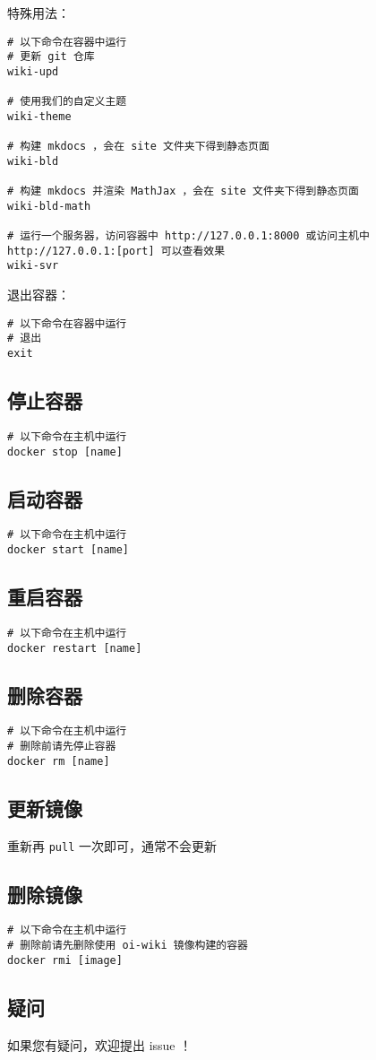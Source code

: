 特殊用法：

\begin{verbatim}
# 以下命令在容器中运行
# 更新 git 仓库
wiki-upd

# 使用我们的自定义主题
wiki-theme

# 构建 mkdocs ，会在 site 文件夹下得到静态页面
wiki-bld

# 构建 mkdocs 并渲染 MathJax ，会在 site 文件夹下得到静态页面
wiki-bld-math

# 运行一个服务器，访问容器中 http://127.0.0.1:8000 或访问主机中 http://127.0.0.1:[port] 可以查看效果
wiki-svr
\end{verbatim}

退出容器：

\begin{verbatim}
# 以下命令在容器中运行
# 退出
exit
\end{verbatim}

\subsection{停止容器}

\begin{verbatim}
# 以下命令在主机中运行
docker stop [name]
\end{verbatim}

\subsection{启动容器}

\begin{verbatim}
# 以下命令在主机中运行
docker start [name]
\end{verbatim}

\subsection{重启容器}

\begin{verbatim}
# 以下命令在主机中运行
docker restart [name]
\end{verbatim}

\subsection{删除容器}

\begin{verbatim}
# 以下命令在主机中运行
# 删除前请先停止容器
docker rm [name]
\end{verbatim}

\subsection{更新镜像}

重新再 \texttt{pull} 一次即可，通常不会更新

\subsection{删除镜像}

\begin{verbatim}
# 以下命令在主机中运行
# 删除前请先删除使用 oi-wiki 镜像构建的容器
docker rmi [image]
\end{verbatim}

\subsection{疑问}

如果您有疑问，欢迎提出 issue ！
